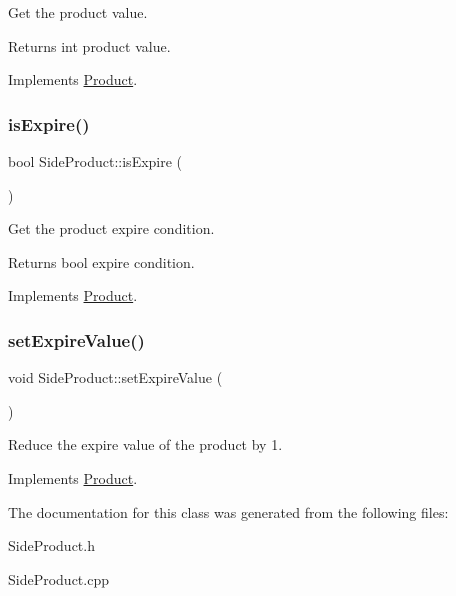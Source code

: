 Get the product value. \begin{DoxyReturn}{Returns}
int product value. 
\end{DoxyReturn}


Implements \hyperlink{classProduct_a5c56d625cae28f43b626578ac4611e43}{Product}.

\mbox{\label{classSideProduct_a9a37b515860c516ec28749f5b562aa0f}} 
\subsubsection{\texorpdfstring{is\+Expire()}{isExpire()}}
{\footnotesize\ttfamily bool Side\+Product\+::is\+Expire (\begin{DoxyParamCaption}{ }\end{DoxyParamCaption})\hspace{0.3cm}{\ttfamily [virtual]}}

Get the product expire condition. \begin{DoxyReturn}{Returns}
bool expire condition. 
\end{DoxyReturn}


Implements \hyperlink{classProduct_aec86d25d77417014f8780ea65416bac7}{Product}.

\mbox{\label{classSideProduct_abff90c90ea13a3511dcd8dbdf55fc33c}} 
\subsubsection{\texorpdfstring{set\+Expire\+Value()}{setExpireValue()}}
{\footnotesize\ttfamily void Side\+Product\+::set\+Expire\+Value (\begin{DoxyParamCaption}{ }\end{DoxyParamCaption})\hspace{0.3cm}{\ttfamily [virtual]}}

Reduce the expire value of the product by 1. 

Implements \hyperlink{classProduct_a84aba139efc9cbcb05d47de168645463}{Product}.



The documentation for this class was generated from the following files\+:\begin{DoxyCompactItemize}
\item 
Side\+Product.\+h\item 
Side\+Product.\+cpp\end{DoxyCompactItemize}
